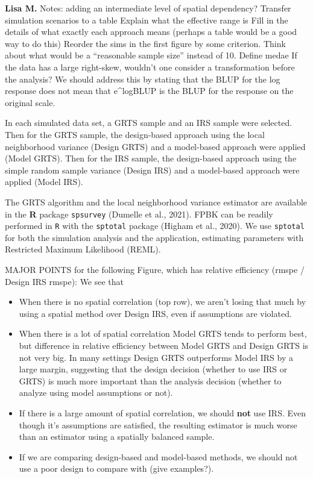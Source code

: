 \documentclass[]{elsarticle} %
\providecommand{\tightlist}{%
  \setlength{\itemsep}{0pt}\setlength{\parskip}{0pt}}
\begin{document}
\textbf{Lisa M.} Notes: adding an intermediate level of spatial
dependency? Transfer simulation scenarios to a table Explain what the
effective range is Fill in the details of what exactly each approach
means (perhaps a table would be a good way to do this) Reorder the sims
in the first figure by some criterion. Think about what would be a
``reasonable sample size'' instead of 10. Define medae If the data has a
large right-skew, wouldn't one consider a transformation before the
analysis? We should address this by stating that the BLUP for the log
response does not mean that e\^{}logBLUP is the BLUP for the response on
the original scale.

In each simulated data set, a GRTS sample and an IRS sample were
selected. Then for the GRTS sample, the design-based approach using the
local neighborhood variance (Design GRTS) and a model-based approach
were applied (Model GRTS). Then for the IRS sample, the design-based
approach using the simple random sample variance (Design IRS) and a
model-based approach were applied (Model IRS).

The GRTS algorithm and the local neighborhood variance estimator are
available in the \textbf{\textsf{R}} package \texttt{spsurvey} (Dumelle
et al., 2021). FPBK can be readily performed in \texttt{R} with the
\texttt{sptotal} package (Higham et al., 2020). We use \texttt{sptotal}
for both the simulation analysis and the application, estimating
parameters with Restricted Maximum Likelihood (REML).

MAJOR POINTS for the following Figure, which has relative efficiency
(rmspe / Design IRS rmspe): We see that

\begin{itemize}
\tightlist
\item
  When there is no spatial correlation (top row), we aren't losing that
  much by using a spatial method over Design IRS, even if assumptions
  are violated.
\item
  When there is a lot of spatial correlation Model GRTS tends to perform
  best, but difference in relative efficiency between Model GRTS and
  Design GRTS is not very big. In many settings Design GRTS outperforms
  Model IRS by a large margin, suggesting that the design decision
  (whether to use IRS or GRTS) is much more important than the analysis
  decision (whether to analyze using model assumptions or not).
\item
  If there is a large amount of spatial correlation, we should
  \textbf{not} use IRS. Even though it's assumptions are satisfied, the
  resulting estimator is much worse than an estimator using a spatially
  balanced sample.
\item
  If we are comparing design-based and model-based methods, we should
  not use a poor design to compare with (give examples?).
\end{itemize}
\end{document}
